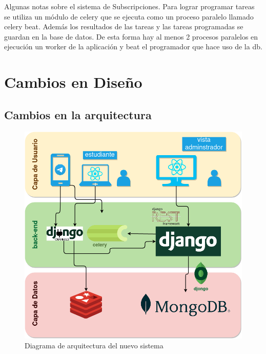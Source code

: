    \par Algunas notas sobre el sistema de Subscripciones. Para lograr programar tareas se utiliza un módulo de celery que se ejecuta como un proceso paralelo llamado celery beat. Además los resultados de las tareas y las tareas programadas se guardan en la base de datos. De esta forma hay al menos 2 procesos paralelos en ejecución un worker de la aplicación y beat el programador que hace uso de la db.

\newpage
\section{Cambios en Diseño}

    \subsection{Cambios en la arquitectura}

    \begin{figure}[h!]
        \centering
        \includegraphics[width=\textwidth]{media/diagramas/arquitectura/nueva_arquitectura.png}
        \caption[Nueva arquitectura]{Diagrama de arquitectura del nuevo sistema}
        \label{fig:arc-new}
    \end{figure}


